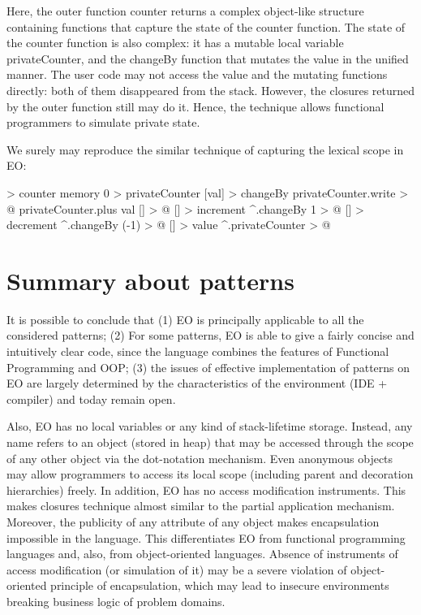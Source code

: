 \documentclass[12pt]{book}
\begin{document}
Here, the outer function counter returns a complex object-like structure containing functions that capture the state of the counter function. The state of the counter function is also complex: it has a mutable local variable privateCounter, and the changeBy function that mutates the value in the unified manner. The user code may not access the value and the mutating functions directly: both of them disappeared from the stack. However, the closures returned by the outer function still may do it. Hence, the technique allows functional programmers to simulate private state. 

We surely may reproduce the similar technique of capturing the lexical scope in EO:
\begin{ffcode}
[] > counter
  memory 0 > privateCounter
  [val] > changeBy
    privateCounter.write > @
      privateCounter.plus val
  [] > @
    [] > increment
      ^.changeBy 1 > @
    [] > decrement
      ^.changeBy (-1) > @
    [] > value
      ^.privateCounter > @

\end{ffcode}

\section{Summary about patterns}
It is possible to conclude that (1) EO is principally applicable to all the considered patterns; (2) For some patterns, EO is able to give a fairly concise and intuitively clear code, since the language combines the features of Functional Programming and OOP; (3) the issues of effective implementation of patterns on EO are largely determined by the characteristics of the environment (IDE + compiler) and today remain open.

Also, EO has no local variables or any kind of stack-lifetime storage. Instead, any name refers to an object (stored in heap) that may be accessed through the scope of any other object via the dot-notation mechanism. Even anonymous objects may allow programmers to access its local scope (including parent and decoration hierarchies) freely. In addition, EO has no access modification instruments. This makes closures technique almost similar to the partial application mechanism. Moreover, the publicity of any attribute of any object makes encapsulation impossible in the language. This differentiates EO from functional programming languages and, also, from object-oriented languages. Absence of instruments of access modification (or simulation of it) may be a severe violation of object-oriented principle of encapsulation, which may lead to insecure environments breaking business logic of problem domains.
\end{document}
